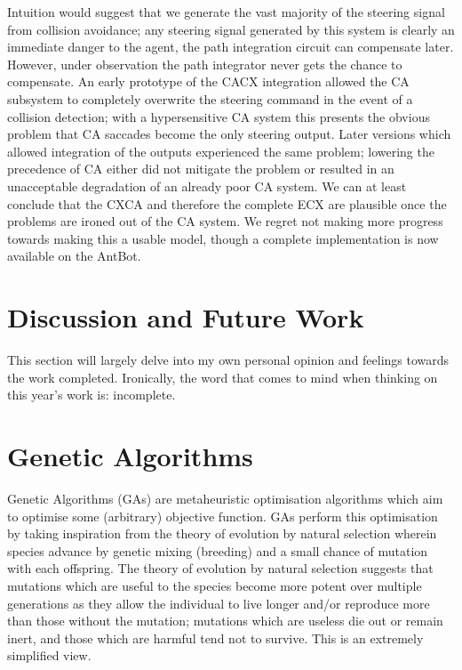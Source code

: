 \documentclass[a4paper,11pt,twoside,openright]{article}
\let\oldsection\section
\def\section{\cleardoublepage\oldsection}
\begin{document}
Intuition would suggest that we generate the vast majority of the
steering signal from collision avoidance; any steering signal
generated by this system is clearly an immediate danger to the agent,
the path integration circuit can compensate later. However, under
observation the path integrator never gets the chance to
compensate. An early prototype of the CACX integration allowed the CA
subsystem to completely overwrite the steering command in the event of
a collision detection; with a hypersensitive CA system this presents
the obvious problem that CA saccades become the only steering output.
Later versions which allowed integration of the outputs experienced
the same problem; lowering the precedence of CA either did not
mitigate the problem or resulted in an unacceptable degradation of an
already poor CA system. We can at least conclude that the CXCA and
therefore the complete ECX are plausible once the problems are ironed
out of the CA system. We regret not making more progress towards
making this a usable model, though a complete implementation is now
available on the AntBot.
\newpage

\section{ Discussion and Future Work}
This section will largely delve into my own personal opinion and
feelings towards the work completed. Ironically, the word that comes
to mind when thinking on this year's work is: incomplete.
\newpage



\appendix
\section{Genetic Algorithms} \label{ap:ga}
Genetic Algorithms (GAs) are metaheuristic
optimisation algorithms which aim to optimise some (arbitrary) objective
function. GAs perform this optimisation by taking inspiration from the
theory of evolution by natural selection wherein species advance by genetic
mixing (breeding) and a small chance of mutation with each offspring.
The theory of evolution by natural selection suggests that mutations
which are useful to the species become more potent over multiple generations
as they allow the individual to live longer and/or reproduce more than those
without the mutation; mutations which are useless die out or remain inert, and
those which are harmful tend not to survive. This is an extremely simplified
view.
\newline
\par
\end{document}
